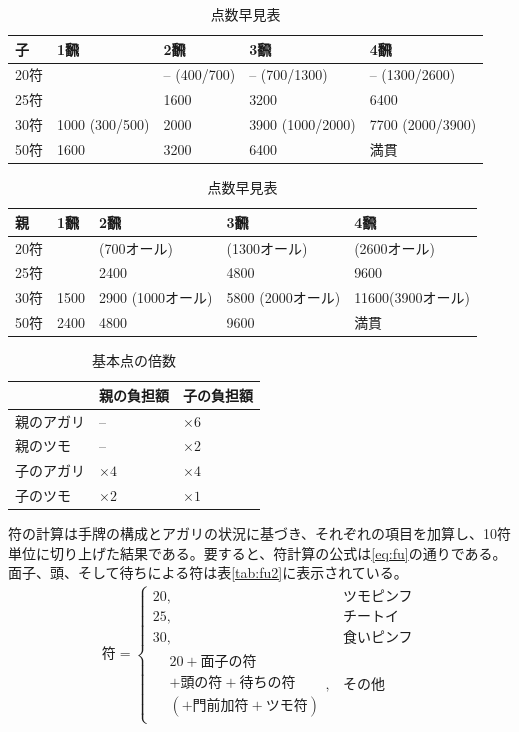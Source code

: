 \documentclass[10pt, twocolumn]{article}
\newlength\stdbls %
\begin{document}
\begin{table}[!b]
  \centering
  \begin{tabular}{l|llll}
    子 & 1飜 & 2飜 & 3飜 & 4飜 \\
    \hline
    20符 & & -- (400/700) & -- (700/1300) & -- (1300/2600) \\
    25符 & & 1600 & 3200 & 6400 \\
    30符 & 1000 (300/500) & 2000 & 3900 (1000/2000) & 7700 (2000/3900) \\
    50符 & 1600 & 3200 & 6400 & 満貫 \\
  \end{tabular}
  
  \vspace{\stdbls}
  
  \centering
  \begin{tabular}{l|llll}
    親 & 1飜 & 2飜 & 3飜 & 4飜 \\
    \hline
    20符 & & (700オール) & (1300オール) & (2600オール) \\
    25符 & & 2400 & 4800 & 9600 \\
    30符 & 1500 & 2900 (1000オール) & 5800 (2000オール) & 11600(3900オール) \\
    50符 & 2400 & 4800 & 9600 & 満貫 \\
  \end{tabular}
  \caption{点数早見表}
  \label{tab:fu}
\end{table}

\begin{table}[ht]
  \centering
  \begin{tabular}{lll}
     & 親の負担額 & 子の負担額 \\
    \hline
    親のアガリ & -- & $\times 6$ \\
    親のツモ & -- & $\times 2$ \\
    子のアガリ & $\times 4$ & $\times 4$ \\
    子のツモ & $\times 2$ & $\times 1$ \\
  \end{tabular}
  \caption{基本点の倍数}
  \label{tab:multiply}
\end{table}

符の計算は手牌の構成とアガリの状況に基づき、それぞれの項目を加算し、10符単位に切り上げた結果である。要すると、符計算の公式は\eqref{eq:fu}の通りである。面子、頭、そして待ちによる符は表\ref{tab:fu2}に表示されている。
%
\begin{align}
  \text{符} = \begin{cases} 20, & \text{ツモピンフ} \\ 25, & \text{チートイ} \\ 30, & \text{食いピンフ} \\ \begin{aligned} &20 + \text{面子の符} \\ &+ \text{頭の符} + \text{待ちの符} \\ &(+ \text{門前加符} + \text{ツモ符}) \end{aligned}, & \text{その他} \end{cases} \label{eq:fu}
\end{align}
\end{document}
